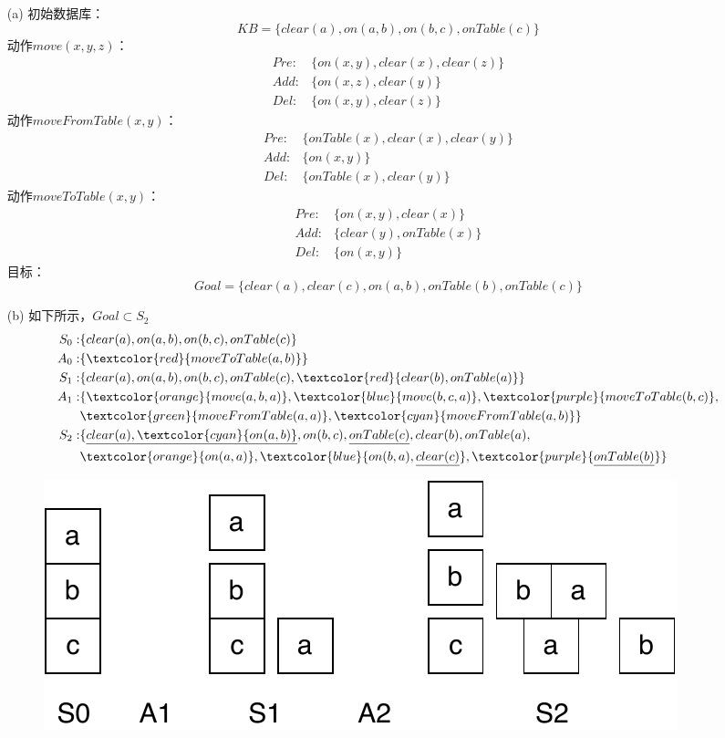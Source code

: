 \documentclass[a4paper, 11pt]{article}
\begin{document}
\begin{answer}
\begin{itemize}
    \item [(a)] 初始数据库：
    \[KB=\{clear(a),on(a,b),on(b,c),onTable(c)\}\]
    动作$move(x,y,z)$：
    \[\begin{aligned}
        Pre:&\{on(x,y),clear(x),clear(z)\}\\
        Add:&\{on(x,z),clear(y)\}\\
        Del:&\{on(x,y),clear(z)\}
    \end{aligned}\]
    动作$moveFromTable(x,y)$：
    \[\begin{aligned}
        Pre:&\{onTable(x),clear(x),clear(y)\}\\
        Add:&\{on(x,y)\}\\
        Del:&\{onTable(x),clear(y)\}
    \end{aligned}\]
    动作$moveToTable(x,y)$：
    \[\begin{aligned}
        Pre:&\{on(x,y),clear(x)\}\\
        Add:&\{clear(y),onTable(x)\}\\
        Del:&\{on(x,y)\}
    \end{aligned}\]
    目标：
    \[Goal=\{clear(a),clear(c),on(a,b),onTable(b),onTable(c)\}\]
    \item [(b)] 如下所示，$Goal\subset S_2$
    \[\begin{aligned}
        S_0 :&\{clear(a),on(a,b),on(b,c),onTable(c)\}\\
        A_0 :&\{\textcolor{red}{moveToTable(a,b)}\}\\
        S_1 :&\{clear(a),on(a,b),on(b,c),onTable(c),\textcolor{red}{clear(b),onTable(a)}\}\\
        A_1 :&\{\textcolor{orange}{move(a,b,a)},\textcolor{blue}{move(b,c,a)},\textcolor{purple}{moveToTable(b,c)},\\
         & \textcolor{green}{moveFromTable(a,a)},\textcolor{cyan}{moveFromTable(a,b)}\}\\
        S_2 :&\{\underline{clear(a),\textcolor{cyan}{on(a,b)}},on(b,c),\underline{onTable(c)},clear(b),onTable(a),\\
         & \textcolor{orange}{on(a,a)},\textcolor{blue}{on(b,a),\underline{clear(c)}},\textcolor{purple}{\underline{onTable(b)}}\}
    \end{aligned}\]
    \begin{figure}[H]
        \centering
        \includegraphics[width=0.6\linewidth]{fig/T03-Q2.pdf}

\end{figure}
\end{itemize}
\end{answer}
\end{document}

